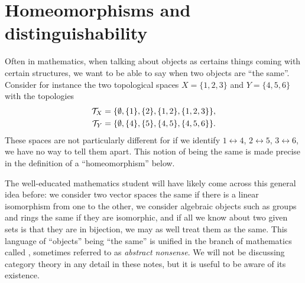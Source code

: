 \section{Homeomorphisms and distinguishability}
\label{homeomorphisms}
Often in mathematics, when talking about objects as certains things coming with certain structures, we want to be able to say when two objects are ``the same''. Consider for instance the two topological spaces $X = \{ 1 , 2 , 3 \}$ and $Y = \{ 4, 5, 6 \}$ with the topologies
\begin{align*}
  \mathcal{T}_X &= \{ \emptyset, \{1 \}, \{ 2 \}, \{ 1, 2 \}, \{1,2,3\} \}, \\
  \mathcal{T}_Y &= \{ \emptyset, \{4 \}, \{ 5 \}, \{ 4, 5 \}, \{4,5,6\} \}.
\end{align*}
These spaces are not particularly different for if we identify $1 \leftrightarrow 4$, $2 \leftrightarrow 5$, $3 \leftrightarrow 6$, we have no way to tell them apart. This notion of being the same is made precise in the definition of a ``homeomorphism'' below.

The well-educated mathematics student will have likely come across this general idea before: we consider two vector spaces the same if there is a linear isomorphism from one to the other, we consider algebraic objects such as groups and rings the same if they are isomorphic, and if all we know about two given sets is that they are in bijection, we may as well treat them as the same. This language of ``objects'' being ``the same'' is unified in the branch of mathematics called , sometimes referred to as \emph{abstract nonsense}. We will not be discussing category theory in any detail in these notes, but it is useful to be aware of its existence.

